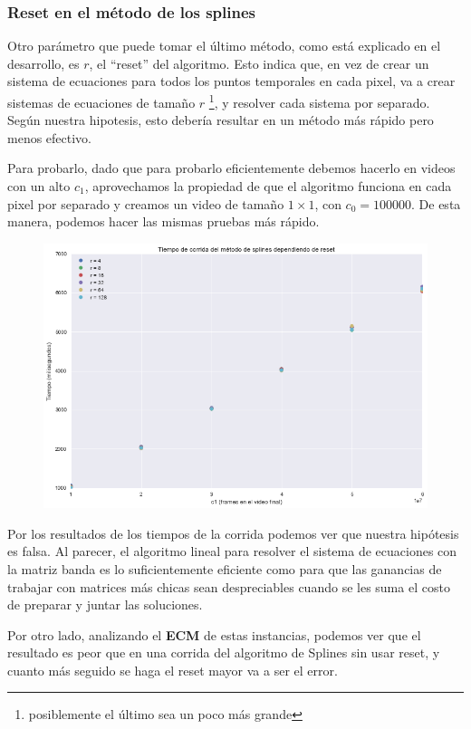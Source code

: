 \subsubsection{Reset en el m\'etodo de los splines}

Otro par\'ametro que puede tomar el \'ultimo m\'etodo, como est\'a explicado en
el desarrollo, es $r$, el ``reset'' del algoritmo. Esto indica que, en vez de
crear un sistema de ecuaciones para todos los puntos temporales en cada pixel,
va a crear sistemas de ecuaciones de tama\~no $r$ \footnote{posiblemente el
\'ultimo sea un poco m\'as grande}, y resolver cada sistema por separado.
Seg\'un nuestra hipotesis, esto deber\'ia resultar en un m\'etodo m\'as r\'apido
pero menos efectivo.

Para probarlo, dado que para probarlo eficientemente debemos hacerlo en videos
con un alto $c_1$, aprovechamos la propiedad de que el algoritmo funciona en
cada pixel por separado y creamos un video de tama\~no $1 \times 1$, con $c_0 =
100000$. De esta manera, podemos hacer las mismas pruebas m\'as r\'apido.

\begin{figure}[H]
\centering
\includegraphics[width=.95\textwidth]{graficos/tiempo_reset.png}
\end{figure}

Por los resultados de los tiempos de la corrida podemos ver que nuestra
hip\'otesis es falsa. Al parecer, el algoritmo lineal para resolver el sistema
de ecuaciones con la matriz banda es lo suficientemente eficiente como para que
las ganancias de trabajar con matrices m\'as chicas sean despreciables cuando se
les suma el costo de preparar y juntar las soluciones.

Por otro lado, analizando el \textbf{ECM} de estas instancias, podemos ver que
el resultado es peor que en una corrida del algoritmo de Splines sin usar reset,
y cuanto m\'as seguido se haga el reset mayor va a ser el error.


